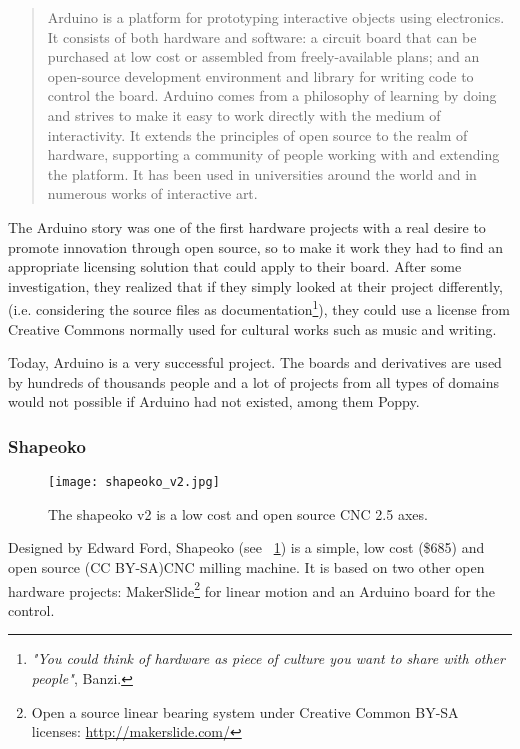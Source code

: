 \begin{quotation}
  Arduino is a platform for prototyping interactive objects using electronics. It consists of both hardware and software: a circuit board that can be purchased at low cost or assembled from freely-available plans; and an open-source development environment and library for writing code to control the board. Arduino comes from a philosophy of learning by doing and strives to make it easy to work directly with the medium of interactivity. It extends the principles of open source to the realm of hardware, supporting a community of people working with and extending the platform. It has been used in universities around the world and in numerous works of interactive art.

\end{quotation}

The Arduino story was one of the first hardware projects with a real desire to promote innovation through open source, so to make it work they had to find an appropriate licensing solution that could apply to their board. After some investigation, they realized that if they simply looked at their project differently, (i.e. considering the source files as documentation\footnote{\emph{"You could think of hardware as piece of culture you want to share with other people"}, Banzi. }), they could use a license from Creative Commons normally used for cultural works such as music and writing.

Today, Arduino is a very successful project. The boards and derivatives are used by hundreds of thousands people and a lot of projects from all types of domains would not possible if Arduino had not existed, among them Poppy.

\subsubsection{Shapeoko}

\begin{figure}[!h]
    \begin{center}
        \texttt{[image: shapeoko\_v2.jpg]}
    \end{center}
    \caption{The shapeoko v2 is a low cost and open source CNC 2.5 axes.}
    \label{fig:shapeoko}
\end{figure}

Designed by Edward Ford, Shapeoko (see \figurename~\ref{fig:shapeoko}) is a simple, low cost (\$685) and open source (CC BY-SA)CNC milling machine. It is based on two other open hardware projects: MakerSlide\footnote{Open a source linear bearing system under Creative Common BY-SA licenses: \url{http://makerslide.com/}} for linear motion and an Arduino board for the control.




